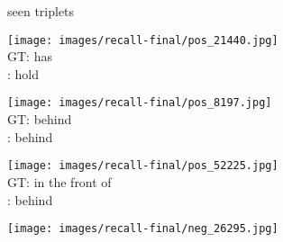 \documentclass[10pt,twocolumn,letterpaper]{article}
\begin{document}
\begin{figure*}[t]
\begin{minipage}[b]{0.005\textwidth}
    	\centering
    	\begin{turn}{90}
    	seen triplets
    	\end{turn}
    	\vspace{3.5ex}
    \end{minipage}
    \hspace{0.01\textwidth}
\begin{minipage}[b]{0.18\textwidth}
    	\centering
       	\texttt{[image: images/recall-final/pos\_21440.jpg]}\\
       	\vspace{0.2ex}
       	\small{
       	GT: has\\
       	\cite{Lu16}: hold
       	}
       	\vspace{0.3ex}
    \end{minipage}
    \hspace{0.005\textwidth}      
\begin{minipage}[b]{0.18\textwidth}
    	\centering
       	\texttt{[image: images/recall-final/pos\_8197.jpg]}\\
       	\vspace{0.2ex}
       	\small{
       	GT: behind\\
       	\cite{Lu16}: behind
       	}
       	\vspace{0.3ex}
    \end{minipage}
    \hspace{0.005\textwidth}
\begin{minipage}[b]{0.18\textwidth}
    	\centering
       	\texttt{[image: images/recall-final/pos\_52225.jpg]}\\
       	\vspace{0.2ex}
       	\small{
       	GT: in the front of\\
       	\cite{Lu16}: behind
       	} 
       	\vspace{0.3ex}
    \end{minipage}
    \hspace{0.005\textwidth}
\begin{minipage}[b]{0.18\textwidth}
    	\centering
      	\texttt{[image: images/recall-final/neg\_26295.jpg]}\\

\end{minipage}
\end{figure*}
\end{document}
